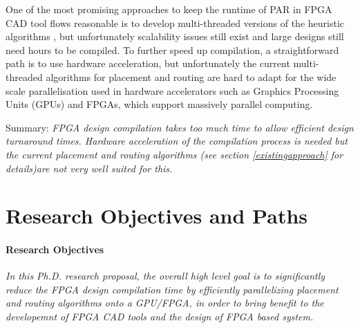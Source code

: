 \documentclass[a4paper,oneside,12pt]{article}
\begin{document}

One of the most promising approaches to keep the runtime of PAR in FPGA CAD tool flows reasonable is to develop multi-threaded versions of the heuristic algorithms \cite{ludwin2011,gort2012,betz2013method,jain2014multi}, but unfortunately scalability issues still exist and large designs still need hours to be compiled. To further speed up compilation, a straightforward path is to use hardware acceleration, but unfortunately the current multi-threaded algorithms for placement and routing are hard to adapt for the wide scale parallelisation used in hardware accelerators such as Graphics Processing Units (GPUs) and FPGAs, which support massively parallel computing.

Summary: \emph{FPGA design compilation takes too much time to allow efficient design turnaround times. Hardware acceleration of the compilation process is needed but the current placement and routing algorithms (see section \ref{existingapproach} for details)are not very well suited for this.
}

\section{Research Objectives and Paths}

\paragraph{Research Objectives}
\emph{In this Ph.D. research proposal, the overall high level goal is to significantly reduce the FPGA design compilation time by efficiently parallelizing placement and routing algorithms onto a GPU/FPGA, in order to bring benefit to the developemnt of FPGA CAD tools and the design of FPGA based system. }
\end{document}

